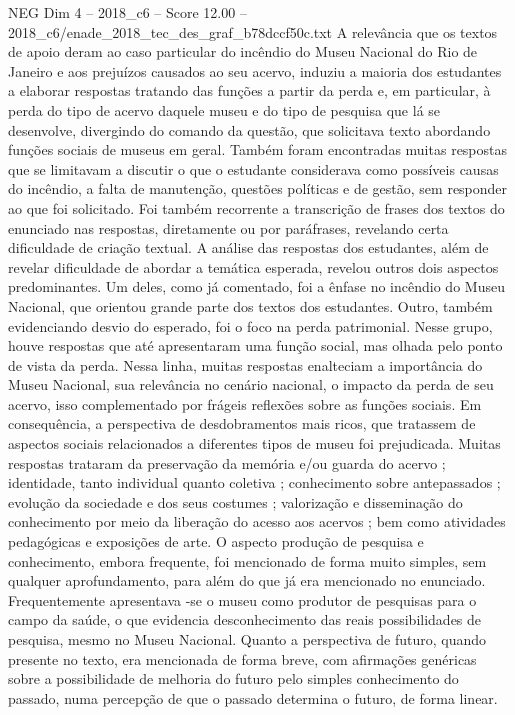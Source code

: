 \begin{textsample}{NEG Dim 4 – 2018\_c6 – Score 12.00 – 2018\_c6/enade\_2018\_tec\_des\_graf\_b78dccf50c.txt}
A relevância que os textos de apoio deram ao caso particular do incêndio do Museu Nacional do Rio de Janeiro e aos prejuízos causados ao seu acervo, induziu a maioria dos estudantes a elaborar respostas tratando das funções a partir da perda e, em particular, à perda do tipo de acervo daquele museu e do tipo de pesquisa que lá se desenvolve, divergindo do comando da questão, que solicitava texto abordando funções sociais de museus em geral.
Também foram encontradas muitas respostas que se limitavam a discutir o que o estudante considerava como possíveis causas do incêndio, a falta de manutenção, questões políticas e de gestão, sem responder ao que foi solicitado.
Foi também recorrente a transcrição de frases dos textos do enunciado nas respostas, diretamente ou por paráfrases, revelando certa dificuldade de criação textual.
A análise das respostas dos estudantes, além de revelar dificuldade de abordar a temática esperada, revelou outros dois aspectos predominantes.
Um deles, como já comentado, foi a ênfase no incêndio do Museu Nacional, que orientou grande parte dos textos dos estudantes.
Outro, também evidenciando desvio do esperado, foi o foco na perda patrimonial.
Nesse grupo, houve respostas que até apresentaram uma função social, mas olhada pelo ponto de vista da perda.
Nessa linha, muitas respostas enalteciam a importância do Museu Nacional, sua relevância no cenário nacional, o impacto da perda de seu acervo, isso complementado por frágeis reflexões sobre as funções sociais.
Em consequência, a perspectiva de desdobramentos mais ricos, que tratassem de aspectos sociais relacionados a diferentes tipos de museu foi prejudicada.
Muitas respostas trataram da preservação da memória e/ou guarda do acervo ; identidade, tanto individual quanto coletiva ; conhecimento sobre antepassados ; evolução da sociedade e dos seus costumes ; valorização e disseminação do conhecimento por meio da liberação do acesso aos acervos ; bem como atividades pedagógicas e exposições de arte.
O aspecto produção de pesquisa e conhecimento, embora frequente, foi mencionado de forma muito simples, sem qualquer aprofundamento, para além do que já era mencionado no enunciado.
Frequentemente apresentava -se o museu como produtor de pesquisas para o campo da saúde, o que evidencia desconhecimento das reais possibilidades de pesquisa, mesmo no Museu Nacional.
Quanto a perspectiva de futuro, quando presente no texto, era mencionada de forma breve, com afirmações genéricas sobre a possibilidade de melhoria do futuro pelo simples conhecimento do passado, numa percepção de que o passado determina o futuro, de forma linear.

\end{textsample}

